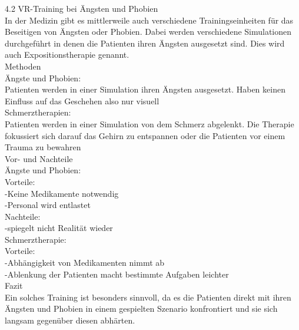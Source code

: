 4.2 VR-Training bei Ängsten und Phobien\\

In der Medizin gibt es mittlerweile auch verschiedene Trainingseinheiten für das Beseitigen von Ängsten oder Phobien. Dabei werden verschiedene Simulationen durchgeführt in denen die Patienten ihren Ängsten ausgesetzt sind. Dies wird auch Expositionstherapie genannt.\\

Methoden\\
Ängste und Phobien:\\
Patienten werden in einer Simulation ihren Ängsten ausgesetzt. Haben keinen Einfluss auf das Geschehen also nur visuell\\

Schmerztherapien:\\
Patienten werden in einer Simulation von dem Schmerz abgelenkt. Die Therapie fokussiert sich darauf das Gehirn zu entspannen oder die Patienten vor einem Trauma zu bewahren\\

Vor- und Nachteile\\

Ängste und Phobien:\\
Vorteile:\\
-Keine Medikamente notwendig\\
-Personal wird entlastet\\
Nachteile:\\
-spiegelt nicht Realität wieder\\

Schmerztherapie:\\
Vorteile:\\
-Abhängigkeit von Medikamenten nimmt ab\\
-Ablenkung der Patienten macht bestimmte Aufgaben leichter\\

Fazit\\
Ein solches Training ist besonders sinnvoll, da es die Patienten direkt mit ihren Ängsten und Phobien in einem gespielten Szenario konfrontiert und sie sich langsam gegenüber diesen abhärten.





